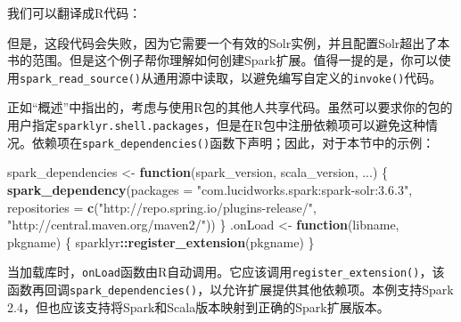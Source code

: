 \documentclass[
]{article}
\newenvironment{Shaded}{\begin{snugshade}}{\end{snugshade}}
\newcommand{\ControlFlowTok}[1]{\textcolor[rgb]{0.13,0.29,0.53}{\textbf{#1}}}
\newcommand{\DataTypeTok}[1]{\textcolor[rgb]{0.13,0.29,0.53}{#1}}
\newcommand{\KeywordTok}[1]{\textcolor[rgb]{0.13,0.29,0.53}{\textbf{#1}}}
\newcommand{\NormalTok}[1]{#1}
\newcommand{\OperatorTok}[1]{\textcolor[rgb]{0.81,0.36,0.00}{\textbf{#1}}}
\newcommand{\StringTok}[1]{\textcolor[rgb]{0.31,0.60,0.02}{#1}}
\begin{document}
我们可以翻译成R代码：

\begin{Shaded}
\end{Shaded}

但是，这段代码会失败，因为它需要一个有效的Solr实例，并且配置Solr超出了本书的范围。但是这个例子帮你理解如何创建Spark扩展。值得一提的是，你可以使用\texttt{spark\_read\_source()}从通用源中读取，以避免编写自定义的\texttt{invoke()}代码。

正如``概述''中指出的，考虑与使用R包的其他人共享代码。虽然可以要求你的包的用户指定\texttt{sparklyr.shell.packages}，但是在R包中注册依赖项可以避免这种情况。依赖项在\texttt{spark\_dependencies()}函数下声明；因此，对于本节中的示例：

\begin{Shaded}
\begin{Highlighting}[]
\NormalTok{spark_dependencies <-}\StringTok{ }\ControlFlowTok{function}\NormalTok{(spark_version, scala_version, ...) \{}
    \KeywordTok{spark_dependency}\NormalTok{(}\DataTypeTok{packages =} \StringTok{"com.lucidworks.spark:spark-solr:3.6.3"}\NormalTok{, }\DataTypeTok{repositories =} \KeywordTok{c}\NormalTok{(}\StringTok{"http://repo.spring.io/plugins-release/"}\NormalTok{, }
        \StringTok{"http://central.maven.org/maven2/"}\NormalTok{))}
\NormalTok{\}}
\NormalTok{.onLoad <-}\StringTok{ }\ControlFlowTok{function}\NormalTok{(libname, pkgname) \{}
\NormalTok{    sparklyr}\OperatorTok{::}\KeywordTok{register_extension}\NormalTok{(pkgname)}
\NormalTok{\}}
\end{Highlighting}
\end{Shaded}

当加载库时，\texttt{onLoad}函数由R自动调用。它应该调用\texttt{register\_extension()}，该函数再回调\texttt{spark\_dependencies()}，以允许扩展提供其他依赖项。本例支持Spark
2.4，但也应该支持将Spark和Scala版本映射到正确的Spark扩展版本。
\end{document}
